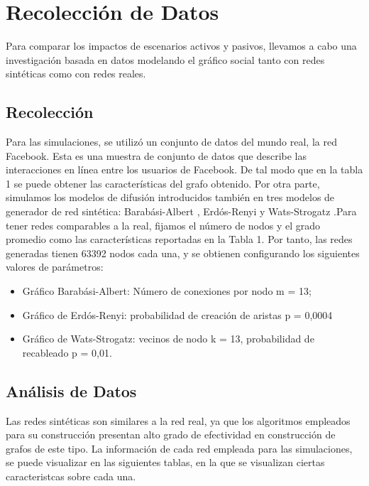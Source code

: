 \documentclass{article}
\begin{document}
\newpage
\section{Recolección de Datos}
Para comparar los impactos de escenarios activos y pasivos, llevamos a cabo una investigación basada en datos modelando el gráfico social tanto con redes sintéticas como con redes reales.

 \subsection{Recolección}
Para las simulaciones, se utilizó un conjunto de datos del mundo real, la red Facebook. Esta es una muestra de \cite[WOSN2009 Viswanath 2009]{viswanath-2009-activity} conjunto de datos que describe las interacciones en línea entre los usuarios de Facebook. De tal modo que en la tabla 1 se puede obtener las características del grafo obtenido.
Por otra parte, simulamos los modelos de difusión introducidos también en tres modelos de generador de red sintética: Barabási-Albert \cite{barabasi:1999}, Erdós-Renyi \cite{erdos:1959} y Wats-Strogatz \cite{watts:1998}.Para tener redes comparables a la real, fijamos el número de nodos y el grado promedio como las características reportadas en la Tabla 1.
Por tanto, las redes generadas tienen 63392 nodos cada una, y se obtienen configurando los siguientes valores de parámetros:

\begin{itemize}
\item Gráfico Barabási-Albert: Número de conexiones por nodo m = 13;
\item Gráfico de Erdós-Renyi: probabilidad de creación de aristas p = 0,0004
\item Gráfico de Wats-Strogatz: vecinos de nodo k = 13, probabilidad de recableado p = 0,01.
\end{itemize} 
 \subsection{Análisis de Datos}	
Las redes sintéticas son similares a la red real, ya que los algoritmos empleados para su construcción presentan alto grado de efectividad en construcción de grafos de este tipo. La información de cada red empleada para las simulaciones, se puede visualizar en las siguientes tablas, en la que se visualizan ciertas caracteristcas sobre cada una.
	
\end{document}

